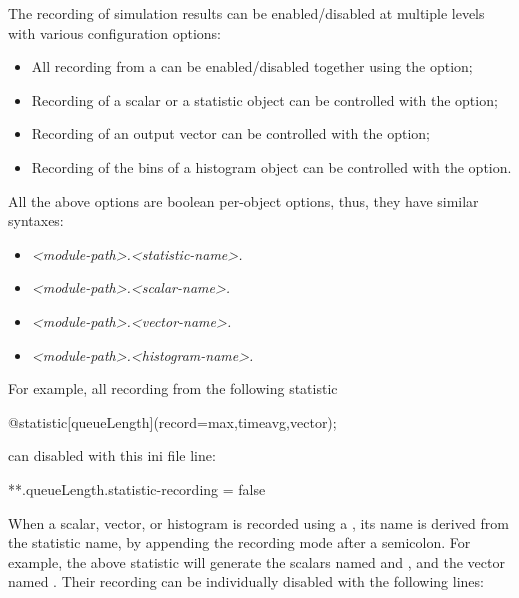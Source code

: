 The recording of simulation results can be enabled/disabled at multiple levels
with various configuration options:

\begin{itemize}
  \item All recording from a  can be enabled/disabled together
        using the  option;
  \item Recording of a scalar or a statistic object can be controlled with the
         option;
  \item Recording of an output vector can be controlled with the 
        option;
  \item Recording of the bins of a histogram object can be controlled with the
         option.
\end{itemize}

All the above options are boolean per-object options, thus, they have similar syntaxes:

\begin{itemize}
\item \textit{<module-path>.<statistic-name>.}
\item \textit{<module-path>.<scalar-name>.}
\item \textit{<module-path>.<vector-name>.}
\item \textit{<module-path>.<histogram-name>.}
\end{itemize}

For example, all recording from the following statistic

\begin{ned}
@statistic[queueLength](record=max,timeavg,vector);
\end{ned}

can disabled with this ini file line:

\begin{inifile}
**.queueLength.statistic-recording = false
\end{inifile}

When a scalar, vector, or histogram is recorded using a ,
its name is derived from the statistic name, by appending the recording
mode after a semicolon. For example, the above statistic will generate 	the
scalars named  and , and the
vector named . Their recording can be individually
disabled with the following lines:

